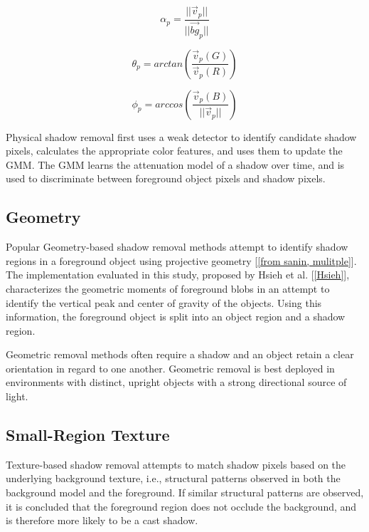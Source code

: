 \begin{equation} \label{eqn:alphaatten}
\alpha_{p} = \dfrac{||\vec{v}_{p}||}{||\vec{bg}_{p}||}
\end{equation}

\begin{equation} \label{eqn:rgangle}
\theta_{p} = arctan(\dfrac{\vec{v}_{p}(G)}{\vec{v}_{p}(R)})
\end{equation}

\begin{equation} \label{eqn:bangle}
\phi_{p} = arccos(\dfrac{\vec{v}_{p}(B)}{||\vec{v}_{p}||})
\end{equation}

Physical shadow removal first uses a weak detector to identify candidate shadow pixels, calculates the appropriate color features, and uses them to update the GMM. The GMM learns the attenuation model of a shadow over time, and is used to discriminate between foreground object pixels and shadow pixels.

\subsection{Geometry}

Popular Geometry-based shadow removal methods attempt to identify shadow regions in a foreground object using projective geometry [\ref{from sanin, mulitple}]. The implementation evaluated in this study, proposed by Hsieh et al. [\ref{Hsieh}], characterizes the geometric moments of foreground blobs in an attempt to identify the vertical peak and center of gravity of the objects. Using this information, the foreground object is split into an object region and a shadow region.

Geometric removal methods often require a shadow and an object retain a clear orientation in regard to one another. Geometric removal is best deployed in environments with distinct, upright objects with a strong directional source of light.  

\subsection{Small-Region Texture}

Texture-based shadow removal attempts to match shadow pixels based on the underlying background texture, i.e., structural patterns observed in both the background model and the foreground. If similar structural patterns are observed, it is concluded that the foreground region does not occlude the background, and is therefore more likely to be a cast shadow.

